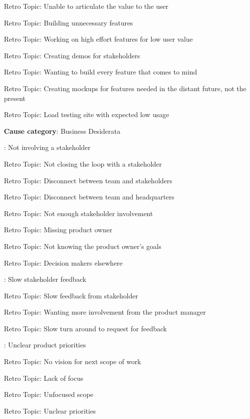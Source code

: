 \quad \quad \quad Retro Topic: Unable to articulate the value to the user

\quad \quad \quad Retro Topic: Building unnecessary features

\quad \quad \quad Retro Topic: Working on high effort features for low user value

\quad \quad \quad Retro Topic: Creating demos for stakeholders

\quad \quad \quad Retro Topic: Wanting to build every feature that comes to mind

\quad \quad \quad Retro Topic: Creating mockups for features needed in the distant future, not the present

\quad \quad \quad Retro Topic: Load testing site with expected low usage

\quad \textbf{Cause category}: Business Desiderata

\quad {}: Not involving a stakeholder

\quad \quad \quad Retro Topic: Not closing the loop with a stakeholder

\quad \quad \quad Retro Topic: Disconnect between team and stakeholders

\quad \quad \quad Retro Topic: Disconnect between team and headquarters

\quad \quad \quad Retro Topic: Not enough stakeholder involvement

\quad \quad \quad Retro Topic: Missing product owner

\quad \quad \quad Retro Topic: Not knowing the product owner's goals

\quad \quad \quad Retro Topic: Decision makers elsewhere

\quad {}: Slow stakeholder feedback

\quad \quad \quad Retro Topic: Slow feedback from stakeholder

\quad \quad \quad Retro Topic: Wanting more involvement from the product manager

\quad \quad \quad Retro Topic: Slow turn around to request for feedback

\quad {}: Unclear product priorities

\quad \quad \quad Retro Topic: No vision for next scope of work

\quad \quad \quad Retro Topic: Lack of focus

\quad \quad \quad Retro Topic: Unfocused scope

\quad \quad \quad Retro Topic: Unclear priorities

